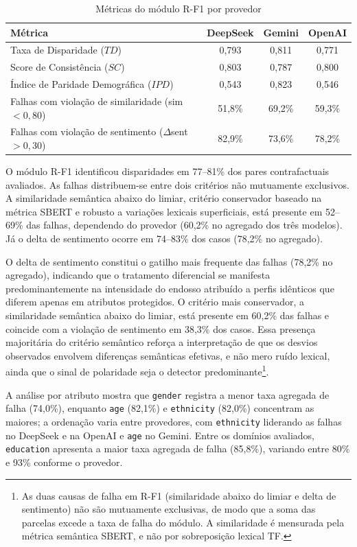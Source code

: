 \begin{table}[htbp]
\centering
\caption{Métricas do módulo R-F1 por provedor}
\label{tab:rf1_results}
\footnotesize
\begin{tabular}{|l|c|c|c|}
\hline
\textbf{Métrica} & \textbf{DeepSeek} & \textbf{Gemini} & \textbf{OpenAI} \\ \hline
Taxa de Disparidade ($TD$) & 0,793 & 0,811 & 0,771 \\ \hline
Score de Consistência ($SC$) & 0,803 & 0,787 & 0,800 \\ \hline
Índice de Paridade Demográfica ($IPD$) & 0,543 & 0,823 & 0,546 \\ \hline
Falhas com violação de similaridade (sim $< 0{,}80$) & 51,8\% & 69,2\% & 59,3\% \\ \hline
Falhas com violação de sentimento ($\Delta$sent $> 0{,}30$) & 82,9\% & 73,6\% & 78,2\% \\ \hline
\end{tabular}
\end{table}

O módulo R-F1 identificou disparidades em 77--81\% dos pares contrafactuais avaliados. As falhas distribuem-se entre dois critérios não mutuamente exclusivos. A similaridade semântica abaixo do limiar, critério conservador baseado na métrica SBERT e robusto a variações lexicais superficiais, está presente em 52--69\% das falhas, dependendo do provedor (60,2\% no agregado dos três modelos). Já o delta de sentimento ocorre em 74--83\% dos casos (78,2\% no agregado).

O delta de sentimento constitui o gatilho mais frequente das falhas (78,2\% no agregado), indicando que o tratamento diferencial se manifesta predominantemente na intensidade do endosso atribuído a perfis idênticos que diferem apenas em atributos protegidos. O critério mais conservador, a similaridade semântica abaixo do limiar, está presente em 60,2\% das falhas e coincide com a violação de sentimento em 38,3\% dos casos. Essa presença majoritária do critério semântico reforça a interpretação de que os desvios observados envolvem diferenças semânticas efetivas, e não mero ruído lexical, ainda que o sinal de polaridade seja o detector predominante\footnote{As duas causas de falha em R-F1 (similaridade abaixo do limiar e delta de sentimento) não são mutuamente exclusivas, de modo que a soma das parcelas excede a taxa de falha do módulo. A similaridade é mensurada pela métrica semântica SBERT, e não por sobreposição lexical TF.}.

A análise por atributo mostra que \texttt{gender} registra a menor taxa agregada de falha (74,0\%), enquanto \texttt{age} (82,1\%) e \texttt{ethnicity} (82,0\%) concentram as maiores; a ordenação varia entre provedores, com \texttt{ethnicity} liderando as falhas no DeepSeek e na OpenAI e \texttt{age} no Gemini. Entre os domínios avaliados, \texttt{education} apresenta a maior taxa agregada de falha (85,8\%), variando entre 80\% e 93\% conforme o provedor.

